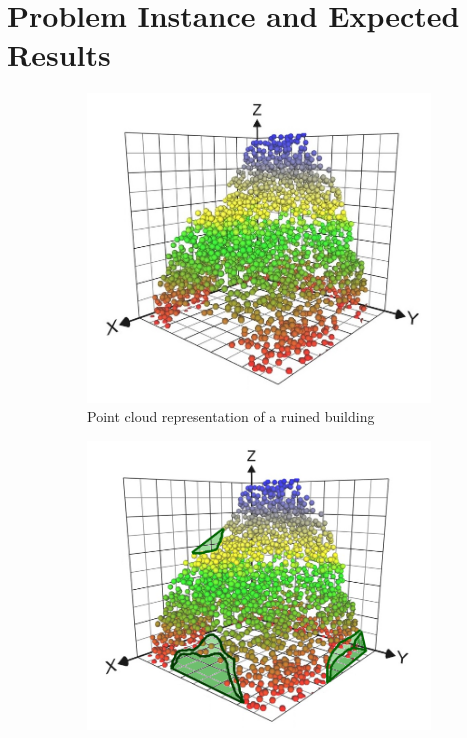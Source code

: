 \documentclass[12pt,a4paper]{article}
\begin{document}
    \section{Problem Instance and Expected Results}
    
        \begin{figure}
        \centering
        \begin{subfigure}[b]{0.3\textwidth}
            \centering
            \includegraphics[width=\textwidth]{scatter1.jpg}
            \caption[]{{\small Point cloud representation of a ruined building}}    
            \label{fig:scatter}
        \end{subfigure}
        \quad
        \begin{subfigure}[b]{0.3\textwidth}  
            \centering 
            \includegraphics[width=\textwidth]{missing2.png}

\end{subfigure}
\end{figure}
\end{document}
